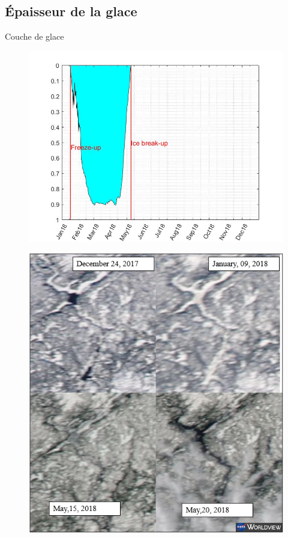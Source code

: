 \documentclass[german,12pt]{beamer}
\begin{document}
\subsection{Épaisseur de la glace}
\begin{frame}{Couche de glace}
\begin{minipage}{0.45\textwidth} %
\begin{figure}
\includegraphics[scale=.25]{ICE2018.jpg}
\end{figure}
 \end{minipage}
\qquad
\begin{minipage}{5cm} %
\begin{figure}
\includegraphics[scale=.5]{Ice_RO2.PNG}

\end{figure}
\end{minipage}
\end{frame}
\end{document}
